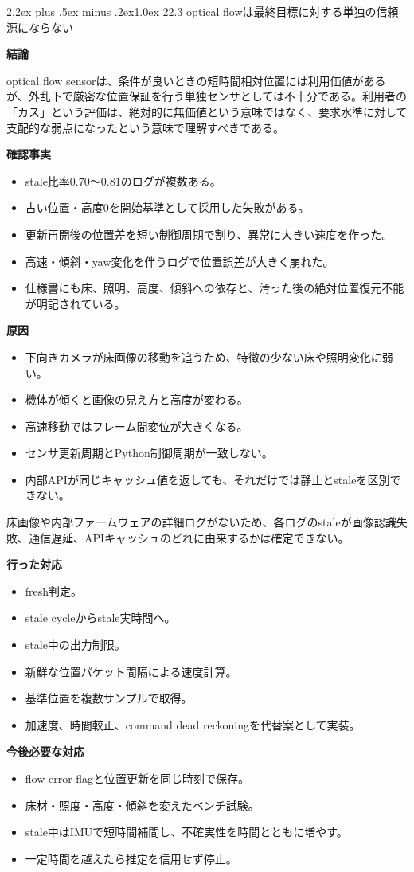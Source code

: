 \documentclass[10pt,a4paper,openany]{ltjsbook}
\makeatletter
\renewcommand\section{\@startsection{section}{1}{0pt}%
  {2.2ex plus .5ex minus .2ex}{1.0ex}%
  {\sffamily\Large\bfseries\color{ReportNavy}}}
\newcommand{\reportlabel}[1]{%
  \par\vspace{0.55em}%
  \noindent\colorbox{ReportTeal}{%
    \parbox{\dimexpr\linewidth-2\fboxsep\relax}{%
      \sffamily\bfseries\color{white}#1%
    }%
  }\par\vspace{0.20em}%
}
\makeatother
\begin{document}
\section{22.3 optical flowは最終目標に対する単独の信頼源にならない}
\reportlabel{結論}
optical flow sensorは、条件が良いときの短時間相対位置には利用価値があるが、外乱下で厳密な位置保証を行う単独センサとしては不十分である。利用者の「カス」という評価は、絶対的に無価値という意味ではなく、要求水準に対して支配的な弱点になったという意味で理解すべきである。\par
\reportlabel{確認事実}
\begin{itemize}
\item stale比率0.70〜0.81のログが複数ある。
\item 古い位置・高度0を開始基準として採用した失敗がある。
\item 更新再開後の位置差を短い制御周期で割り、異常に大きい速度を作った。
\item 高速・傾斜・yaw変化を伴うログで位置誤差が大きく崩れた。
\item 仕様書にも床、照明、高度、傾斜への依存と、滑った後の絶対位置復元不能が明記されている。
\end{itemize}
\reportlabel{原因}
\begin{itemize}
\item 下向きカメラが床画像の移動を追うため、特徴の少ない床や照明変化に弱い。
\item 機体が傾くと画像の見え方と高度が変わる。
\item 高速移動ではフレーム間変位が大きくなる。
\item センサ更新周期とPython制御周期が一致しない。
\item 内部APIが同じキャッシュ値を返しても、それだけでは静止とstaleを区別できない。
\end{itemize}
床画像や内部ファームウェアの詳細ログがないため、各ログのstaleが画像認識失敗、通信遅延、APIキャッシュのどれに由来するかは確定できない。\par
\reportlabel{行った対応}
\begin{itemize}
\item fresh判定。
\item stale cycleからstale実時間へ。
\item stale中の出力制限。
\item 新鮮な位置パケット間隔による速度計算。
\item 基準位置を複数サンプルで取得。
\item 加速度、時間較正、command dead reckoningを代替案として実装。
\end{itemize}
\reportlabel{今後必要な対応}
\begin{itemize}
\item flow error flagと位置更新を同じ時刻で保存。
\item 床材・照度・高度・傾斜を変えたベンチ試験。
\item stale中はIMUで短時間補間し、不確実性を時間とともに増やす。
\item 一定時間を越えたら推定を信用せず停止。
\end{itemize}
\end{document}
